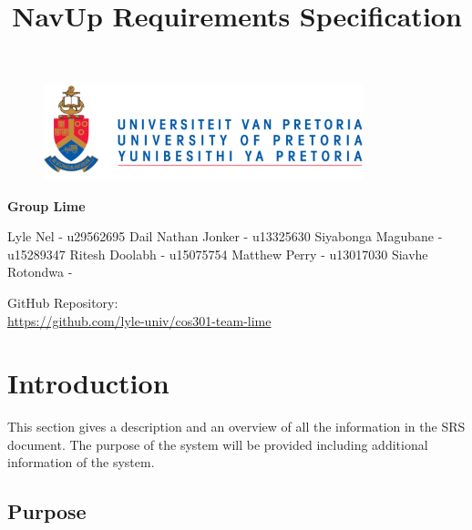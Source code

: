 \documentclass{article}
\begin{document}
		\begin{figure}[t]
			\centering
			\includegraphics[width=350px]{UP_Logo.PNG}
		\end{figure}
				\title{NavUp Requirements Specification}
\maketitle
		\begin{center}
			\textbf{\newline Group Lime} \\
		\end{center}
			
				
		\begin{flushright} \large
			Lyle Nel -  u29562695 \newline
			Dail Nathan Jonker -  u13325630 \newline
			Siyabonga Magubane  - u15289347 \newline
			Ritesh Doolabh - u15075754 \newline
			Matthew Perry - u13017030 \newline
			Siavhe Rotondwa - \newline
		\end{flushright}
		
		
		
		
		GitHub Repository: \href{https://github.com/lyle-univ/cos301-team-lime}\\
		\url{https://github.com/lyle-univ/cos301-team-lime}
	

\clearpage
\tableofcontents

\clearpage
\section{Introduction}

This section gives a description and an overview of all the information in the SRS document. The purpose of the system will be provided including additional information of the system.

	\subsection{Purpose}
	
	
\end{document}
